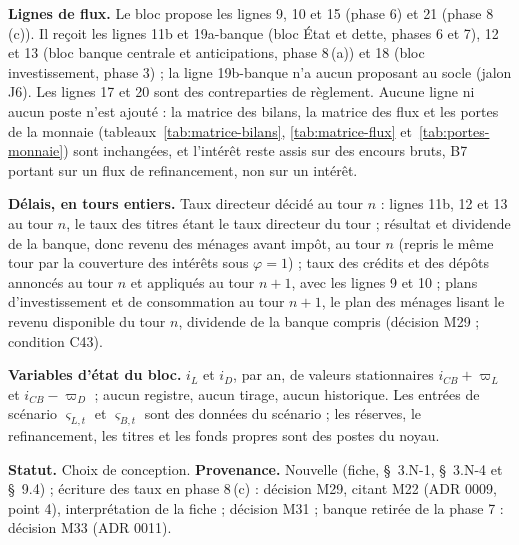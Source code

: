 \documentclass[11pt,a4paper]{article}
\begin{document}
\begin{proposee}
\textbf{Lignes de flux.} Le bloc propose les lignes 9, 10 et 15 (phase 6) et 21 (phase 8\,(c)). Il reçoit les lignes 11b et 19a-banque (bloc État et dette, phases 6 et 7), 12 et 13 (bloc banque centrale et anticipations, phase 8\,(a)) et 18 (bloc investissement, phase 3) ; la ligne 19b-banque n'a aucun proposant au socle (jalon J6). Les lignes 17 et 20 sont des contreparties de règlement. Aucune ligne ni aucun poste n'est ajouté : la matrice des bilans, la matrice des flux et les portes de la monnaie (tableaux~\ref{tab:matrice-bilans}, \ref{tab:matrice-flux} et~\ref{tab:portes-monnaie}) sont inchangées, et l'intérêt reste assis sur des encours bruts, B7 portant sur un flux de refinancement, non sur un intérêt.

\textbf{Délais, en tours entiers.} Taux directeur décidé au tour $n$ : lignes 11b, 12 et 13 au tour $n$, le taux des titres étant le taux directeur du tour ; résultat et dividende de la banque, donc revenu des ménages avant impôt, au tour $n$ (repris le même tour par la couverture des intérêts sous $\varphi = 1$) ; taux des crédits et des dépôts annoncés au tour $n$ et appliqués au tour $n + 1$, avec les lignes 9 et 10 ; plans d'investissement et de consommation au tour $n + 1$, le plan des ménages lisant le revenu disponible du tour $n$, dividende de la banque compris (décision M29 ; condition C43).

\textbf{Variables d'état du bloc.} $i_L$ et $i_D$, par an, de valeurs stationnaires $i_{\mathit{CB}} + \varpi_L$ et $i_{\mathit{CB}} - \varpi_D$ ; aucun registre, aucun tirage, aucun historique. Les entrées de scénario $\varsigma_{L,t}$ et $\varsigma_{B,t}$ sont des données du scénario ; les réserves, le refinancement, les titres et les fonds propres sont des postes du noyau.

\textbf{Statut.} Choix de conception. \textbf{Provenance.} Nouvelle (fiche, \S~3.N-1, \S~3.N-4 et \S~9.4) ; écriture des taux en phase 8\,(c) : décision M29, citant M22 (ADR 0009, point 4), interprétation de la fiche ; décision M31 ; banque retirée de la phase 7 : décision M33 (ADR 0011).
\end{proposee}
\end{document}

